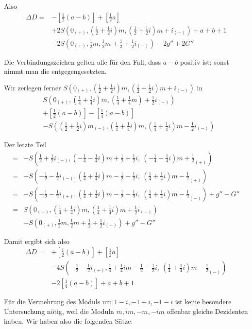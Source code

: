 Also
\[
\begin{aligned}
\Delta D={}&-\left[\tfrac12(a-b)\right]+\left[\tfrac12a\right]\\
&+2S(0_{(+)},(\tfrac12+\tfrac12i)m,(\tfrac12+\tfrac12i)m+i_{(-)})+a+b+1\\
&-2S(0_{(+)},\tfrac12m,\tfrac12m+\tfrac12+\tfrac12i_{(-)})-2g''+2G''
\end{aligned}
\]

Die Verbindungszeichen gelten alle für den Fall, dass $a-b$ positiv ist; sonst nimmt man die entgegengesetzten.

Wir zerlegen ferner $S(0_{(+)},(\frac12+\frac12i)m,(\frac12+\frac12i)m+i_{(-)})$ in
\[
\begin{aligned}
&S(0_{(+)},(\tfrac14+\tfrac14i)m,(\tfrac14+\tfrac14m)+\tfrac12i_{(-)})\\
&+\left[\tfrac12(a-b)\right]-\left[\tfrac14(a-b)\right]\\
&-S((\tfrac12+\tfrac12i)m_{(-)},(\tfrac14+\tfrac14i)m,(\tfrac14+\tfrac14i)m-\tfrac12i_{(-)})
\end{aligned}
\]


Der letzte Teil
\[
\begin{aligned}
={}&-S(\tfrac12+\tfrac12i_{(-)},(-\tfrac14-\tfrac14i)m+\tfrac12+\tfrac12i,\ (-\tfrac14-\tfrac14i)m+\tfrac12_{(+)})\\
={}&-S(-\tfrac12-\tfrac12i_{(-)},(\tfrac14+\tfrac14i)m-\tfrac12-\tfrac12i,\ (\tfrac14+\tfrac14i)m-\tfrac12_{(+)})\\
={}&-S(-\tfrac12-\tfrac12i_{(+)},(\tfrac14+\tfrac14i)m-\tfrac12-\tfrac12i,\ (\tfrac14+\tfrac14i)m-\tfrac12_{(-)})+g''-G''\\
={}&S(0_{(+)},(\tfrac14+\tfrac14i)m,(\tfrac14+\tfrac14i)m+\tfrac12i_{(-)})\\
&-S(0_{(+)},\tfrac12m,\tfrac12m+\tfrac12+\tfrac12i_{(-)})+g''-G''
\end{aligned}
\]

Damit ergibt sich also
\[
\begin{aligned}
\Delta D={}&+\left[\tfrac12(a-b)\right]+\left[\tfrac12a\right]\\
&-4S(-\tfrac12-\tfrac12i_{(+)},\tfrac14+\tfrac14im-\tfrac12-\tfrac12i,\ (\tfrac14+\tfrac14i)m-\tfrac12_{(-)})\\
&-2\left[\tfrac14(a-b)\right]+a+b+1
\end{aligned}
\]

Für die Vermehrung des Moduls um $1-i,-1+i,-1-i$ ist keine besondere Untersuchung nötig, weil die Moduln $m,im,-m,-im$ offenbar gleiche Dezidenten haben. Wir haben also die folgenden Sätze:

